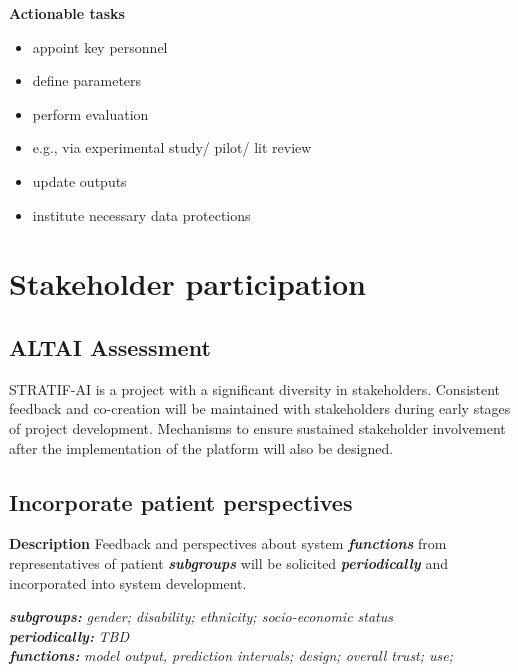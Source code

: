 \documentclass[
  letterpaper,
  DIV=11,
  numbers=noendperiod]{scrreport}
\providecommand{\tightlist}{%
  \setlength{\itemsep}{0pt}\setlength{\parskip}{0pt}}\usepackage{longtable,booktabs,array}
\begin{document}
\textbf{Actionable tasks}

\begin{itemize}
\tightlist
\item
  appoint key personnel
\item
  define parameters
\item
  perform evaluation
\item
  e.g., via experimental study/ pilot/ lit review
\item
  update outputs
\item
  institute necessary data protections
\end{itemize}

\hypertarget{stakeholder-participation}{%
\section{Stakeholder participation}\label{stakeholder-participation}}

\hypertarget{altai-assessment-13}{%
\subsection*{ALTAI Assessment}\label{altai-assessment-13}}

STRATIF-AI is a project with a significant diversity in stakeholders.
Consistent feedback and co-creation will be maintained with stakeholders
during early stages of project development. Mechanisms to ensure
sustained stakeholder involvement after the implementation of the
platform will also be designed.

\hypertarget{incorporate-patient-perspectives}{%
\subsection{Incorporate patient
perspectives}\label{incorporate-patient-perspectives}}

\textbf{Description} Feedback and perspectives about system
\textbf{\emph{functions}} from representatives of patient
\textbf{\emph{subgroups}} will be solicited \textbf{\emph{periodically}}
and incorporated into system development.

\textbf{\emph{subgroups:}} \emph{gender; disability; ethnicity;
socio-economic status}\\
\textbf{\emph{periodically:}} \emph{TBD}\\
\textbf{\emph{functions:}} \emph{model output, prediction intervals;
design; overall trust; use;}
\end{document}
